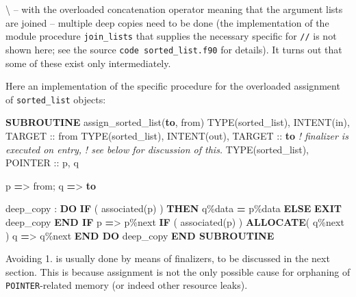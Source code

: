 \documentclass[]{scrartcl}
\newenvironment{Shaded}{}{}
\newcommand{\CommentTok}[1]{\textcolor[rgb]{0.38,0.63,0.69}{\textit{#1}}}
\newcommand{\DataTypeTok}[1]{\textcolor[rgb]{0.56,0.13,0.00}{#1}}
\newcommand{\FunctionTok}[1]{\textcolor[rgb]{0.02,0.16,0.49}{#1}}
\newcommand{\KeywordTok}[1]{\textcolor[rgb]{0.00,0.44,0.13}{\textbf{#1}}}
\newcommand{\NormalTok}[1]{#1}
\newcommand{\OperatorTok}[1]{\textcolor[rgb]{0.40,0.40,0.40}{#1}}
\begin{document}
\textbackslash{} -- with the overloaded concatenation operator meaning
that the argument lists are joined -- multiple deep copies need to be
done (the implementation of the module procedure \texttt{join\_lists}
that supplies the necessary specific for \texttt{//} is not shown here;
see the source \texttt{code\ sorted\_list.f90} for details). It turns
out that some of these exist only intermediately.

Here an implementation of the specific procedure for the overloaded
assignment of \texttt{sorted\_list} objects:

\begin{Shaded}
\begin{Highlighting}[]
\KeywordTok{SUBROUTINE}\NormalTok{ assign\_sorted\_list(}\KeywordTok{to}\NormalTok{, from)}
   \DataTypeTok{TYPE(sorted\_list)}\NormalTok{, }\DataTypeTok{INTENT(in)}\NormalTok{, }\DataTypeTok{TARGET} \DataTypeTok{::}\NormalTok{ from}
   \DataTypeTok{TYPE(sorted\_list)}\NormalTok{, }\DataTypeTok{INTENT(out)}\NormalTok{, }\DataTypeTok{TARGET} \DataTypeTok{::} \KeywordTok{to}  \CommentTok{! finalizer is executed on entry,}
                                                 \CommentTok{! see below for discussion of this.}
   \DataTypeTok{TYPE(sorted\_list)}\NormalTok{, }\DataTypeTok{POINTER} \DataTypeTok{::}\NormalTok{ p, q}

\NormalTok{   p }\KeywordTok{=}\OperatorTok{\textgreater{}}\NormalTok{ from; q }\KeywordTok{=}\OperatorTok{\textgreater{}} \KeywordTok{to}

\NormalTok{   deep\_copy : }\KeywordTok{DO}
      \KeywordTok{IF}\NormalTok{ ( }\FunctionTok{associated}\NormalTok{(p) ) }\KeywordTok{THEN}
\NormalTok{         q}\OperatorTok{\%}\NormalTok{data }\KeywordTok{=}\NormalTok{ p}\OperatorTok{\%}\NormalTok{data}
      \KeywordTok{ELSE}
         \KeywordTok{EXIT}\NormalTok{ deep\_copy}
      \KeywordTok{END IF}
\NormalTok{      p }\KeywordTok{=}\OperatorTok{\textgreater{}}\NormalTok{ p}\OperatorTok{\%}\NormalTok{next}
      \KeywordTok{IF}\NormalTok{ ( }\FunctionTok{associated}\NormalTok{(p) ) }\KeywordTok{ALLOCATE}\NormalTok{( q}\OperatorTok{\%}\NormalTok{next )}
\NormalTok{      q }\KeywordTok{=}\OperatorTok{\textgreater{}}\NormalTok{ q}\OperatorTok{\%}\NormalTok{next}
   \KeywordTok{END DO}\NormalTok{ deep\_copy}
\KeywordTok{END SUBROUTINE}
\end{Highlighting}
\end{Shaded}

Avoiding 1. is usually done by means of finalizers, to be discussed in
the next section. This is because assignment is not the only possible
cause for orphaning of \texttt{POINTER}-related memory (or indeed other
resource leaks).
\end{document}
